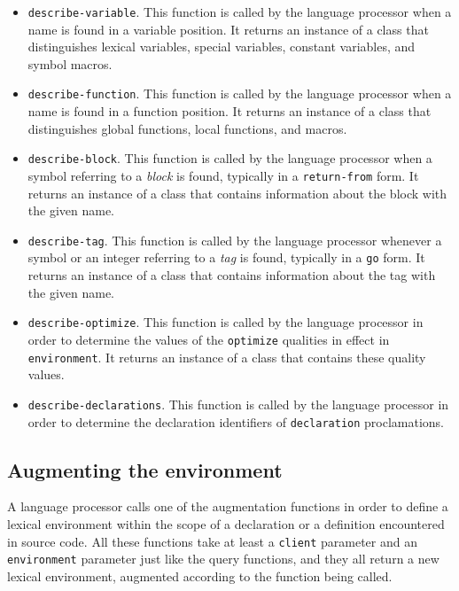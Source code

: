 \begin{itemize}
\item \texttt{describe-variable}.  This function is called by the
  language processor when a name is found in a variable position.  It
  returns an instance of a class that distinguishes lexical variables,
  special variables, constant variables, and symbol macros.
\item \texttt{describe-function}.  This function is called by the
  language processor when a name is found in a function position.  It
  returns an instance of a class that distinguishes global functions,
  local functions, and macros.
\item \texttt{describe-block}.  This function is called by the
  language processor when a symbol referring to a \emph{block} is
  found, typically in a \texttt{return-from} form.  It returns an
  instance of a class that contains information about the block with
  the given name.
\item \texttt{describe-tag}.  This function is called by the language
  processor whenever a symbol or an integer referring to a \emph{tag}
  is found, typically in a \texttt{go} form.  It returns an instance
  of a class that contains information about the tag with the given
  name.
\item \texttt{describe-optimize}.  This function is called by the
  language processor in order to determine the values of the
  \texttt{optimize} qualities in effect in \texttt{environment}.  It
  returns an instance of a class that contains these quality values.
\item \texttt{describe-declarations}.  This function is called by the
  language processor in order to determine the declaration identifiers
  of \texttt{declaration} proclamations.
\end{itemize}

\subsection{Augmenting the environment}

A language processor calls one of the augmentation functions in order
to define a lexical environment within the scope of a declaration or a
definition encountered in source code.  All these functions take at
least a \texttt{client} parameter and an \texttt{environment}
parameter just like the query functions, and they all return a new
lexical environment, augmented according to the function being called.

